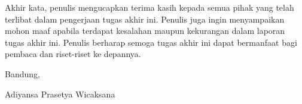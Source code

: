 Akhir kata, penulis mengucapkan terima kasih kepada semua pihak yang telah terlibat dalam pengerjaan tugas akhir ini. Penulis juga ingin menyampaikan mohon maaf apabila terdapat kesalahan maupun kekurangan dalam laporan tugas akhir ini. Penulis berharap semoga tugas akhir ini dapat bermanfaat bagi pembaca dan riset-riset ke depannya.

\begin{flushright}
    \vspace{0.5cm}
    Bandung, \tanggalpengesahan


    \vspace{1.5cm}

    Adiyansa Prasetya Wicaksana
\end{flushright}
